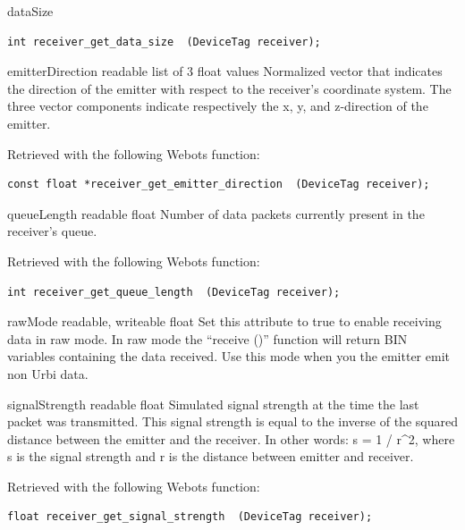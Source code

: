 \begin{itemize}
\begin{attribute}{dataSize}
\begin{lstlisting}
int receiver_get_data_size  (DeviceTag receiver);
\end{lstlisting}
\end{attribute}

\begin{attribute}{emitterDirection}
  {readable}
  {list of 3 float values}
  {}
  Normalized vector that indicates the direction of the
 emitter with respect to the receiver's coordinate system. The three
 vector components indicate respectively the x, y, and z-{}direction
 of the emitter.


          Retrieved with the following Webots function:


\begin{lstlisting}
const float *receiver_get_emitter_direction  (DeviceTag receiver);
\end{lstlisting}
\end{attribute}

\begin{attribute}{queueLength}
  {readable}
  {float}
  {}
  Number of data packets currently present in the
 receiver's queue.


          Retrieved with the following Webots function:


\begin{lstlisting}
int receiver_get_queue_length  (DeviceTag receiver);
\end{lstlisting}
\end{attribute}

\begin{attribute}{rawMode}
  {readable, writeable}
  {float}
  {}
  Set this attribute to true to enable receiving data in
 raw mode.  In raw mode the ``receive ()'' function will return BIN
 variables containing the data received. Use this mode when you the
 emitter emit non Urbi data.
\end{attribute}

\begin{attribute}{signalStrength}
  {readable}
  {float}
  {}
  Simulated signal strength at the time the last packet
 was transmitted.  This signal strength is equal to the inverse of the
 squared distance between the emitter and the receiver. In other
 words: s = 1 / r\^{}2, where s is the signal strength and r is the
 distance between emitter and receiver.


          Retrieved with the following Webots function:


\begin{lstlisting}
float receiver_get_signal_strength  (DeviceTag receiver);
\end{lstlisting}
\end{attribute}

\end{itemize}

